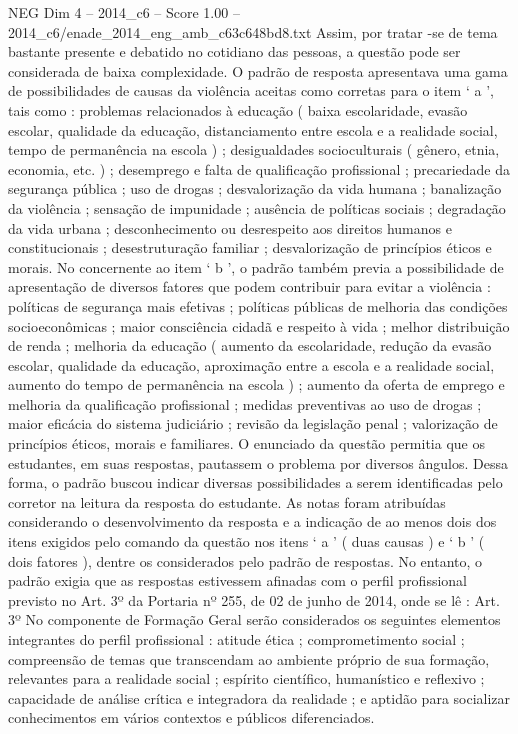 \begin{textsample}{NEG Dim 4 – 2014\_c6 – Score 1.00 – 2014\_c6/enade\_2014\_eng\_amb\_c63c648bd8.txt}
Assim, por tratar -se de tema bastante presente e debatido no cotidiano das pessoas, a questão pode ser considerada de baixa complexidade.
O padrão de resposta apresentava uma gama de possibilidades de causas da violência aceitas como corretas para o item ‘ a ’, tais como : problemas relacionados à educação ( baixa escolaridade, evasão escolar, qualidade da educação, distanciamento entre escola e a realidade social, tempo de permanência na escola ) ; desigualdades socioculturais ( gênero, etnia, economia, etc. ) ; desemprego e falta de qualificação profissional ; precariedade da segurança pública ; uso de drogas ; desvalorização da vida humana ; banalização da violência ; sensação de impunidade ; ausência de políticas sociais ; degradação da vida urbana ; desconhecimento ou desrespeito aos direitos humanos e constitucionais ; desestruturação familiar ; desvalorização de princípios éticos e morais.
No concernente ao item ‘ b ’, o padrão também previa a possibilidade de apresentação de diversos fatores que podem contribuir para evitar a violência : políticas de segurança mais efetivas ; políticas públicas de melhoria das condições socioeconômicas ; maior consciência cidadã e respeito à vida ; melhor distribuição de renda ; melhoria da educação ( aumento da escolaridade, redução da evasão escolar, qualidade da educação, aproximação entre a escola e a realidade social, aumento do tempo de permanência na escola ) ; aumento da oferta de emprego e melhoria da qualificação profissional ; medidas preventivas ao uso de drogas ; maior eficácia do sistema judiciário ; revisão da legislação penal ; valorização de princípios éticos, morais e familiares.
O enunciado da questão permitia que os estudantes, em suas respostas, pautassem o problema por diversos ângulos.
Dessa forma, o padrão buscou indicar diversas possibilidades a serem identificadas pelo corretor na leitura da resposta do estudante.
As notas foram atribuídas considerando o desenvolvimento da resposta e a indicação de ao menos dois dos itens exigidos pelo comando da questão nos itens ‘ a ’ ( duas causas ) e ‘ b ’ ( dois fatores ), dentre os considerados pelo padrão de respostas.
No entanto, o padrão exigia que as respostas estivessem afinadas com o perfil profissional previsto no Art. 3º da Portaria nº 255, de 02 de junho de 2014, onde se lê : Art. 3º No componente de Formação Geral serão considerados os seguintes elementos integrantes do perfil profissional : atitude ética ; comprometimento social ; compreensão de temas que transcendam ao ambiente próprio de sua formação, relevantes para a realidade social ; espírito científico, humanístico e reflexivo ; capacidade de análise crítica e integradora da realidade ; e aptidão para socializar conhecimentos em vários contextos e públicos diferenciados.

\end{textsample}
